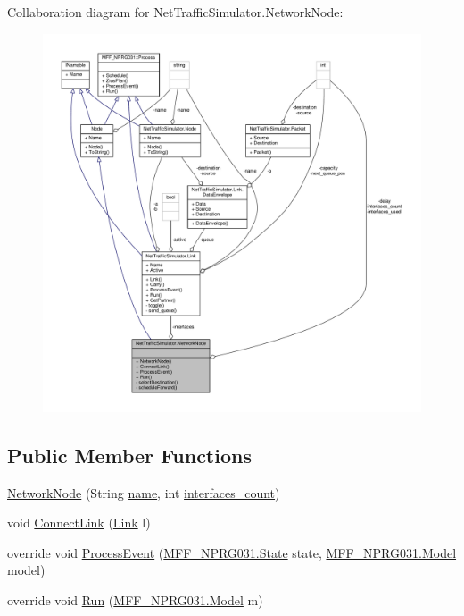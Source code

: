 Collaboration diagram for Net\-Traffic\-Simulator.\-Network\-Node\-:\nopagebreak
\begin{figure}[H]
\begin{center}
\leavevmode
\includegraphics[width=350pt]{classNetTrafficSimulator_1_1NetworkNode__coll__graph}
\end{center}
\end{figure}
\subsection*{Public Member Functions}
\begin{DoxyCompactItemize}
\item 
\hyperlink{classNetTrafficSimulator_1_1NetworkNode_a72e36bcc5eb67db3e7354a01812fcbd9}{Network\-Node} (String \hyperlink{classNetTrafficSimulator_1_1Node_a679d5b6cca77c0cdb46cc98c347d4747}{name}, int \hyperlink{classNetTrafficSimulator_1_1NetworkNode_af9b9d881f9c1b02749716bb12efb5f66}{interfaces\-\_\-count})
\item 
void \hyperlink{classNetTrafficSimulator_1_1NetworkNode_a03e1d48e53fa9405411664e75792b5ec}{Connect\-Link} (\hyperlink{classNetTrafficSimulator_1_1Link}{Link} l)
\item 
override void \hyperlink{classNetTrafficSimulator_1_1NetworkNode_a4a629c1d159d4addef85742089506d20}{Process\-Event} (\hyperlink{classMFF__NPRG031_1_1State}{M\-F\-F\-\_\-\-N\-P\-R\-G031.\-State} state, \hyperlink{classMFF__NPRG031_1_1Model}{M\-F\-F\-\_\-\-N\-P\-R\-G031.\-Model} model)
\item 
override void \hyperlink{classNetTrafficSimulator_1_1NetworkNode_ac4210159f0193e7872d356f40f0b99fe}{Run} (\hyperlink{classMFF__NPRG031_1_1Model}{M\-F\-F\-\_\-\-N\-P\-R\-G031.\-Model} m)
\end{DoxyCompactItemize}
